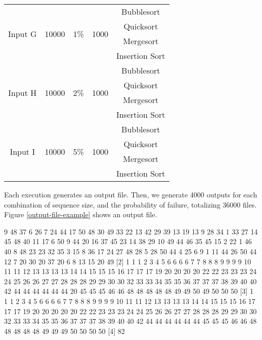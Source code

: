 \begin{table}[H]
\begin{center}
\begin{tabular}{|c|c|c|c|c|}
    \hline
    \multirow{4}{*}{Input G} & \multirow{4}{*}{10000} & \multirow{4}{*}{1\%} & \multirow{4}{*}{1000} & Bubblesort \\ 
    & & & & Quicksort \\
    & & & & Mergesort \\
    & & & & Insertion Sort \\
    \hline
    \multirow{4}{*}{Input H} & \multirow{4}{*}{10000} & \multirow{4}{*}{2\%} & \multirow{4}{*}{1000} & Bubblesort \\ 
    & & & & Quicksort \\
    & & & & Mergesort \\
    & & & & Insertion Sort \\
    \hline
    \multirow{4}{*}{Input I} & \multirow{4}{*}{10000} & \multirow{4}{*}{5\%} & \multirow{4}{*}{1000} & Bubblesort \\ 
    & & & & Quicksort \\
    & & & & Mergesort \\
    & & & & Insertion Sort \\
    \hline
    \end{tabular}
    \label{table-input-data}
    \end{center}
\end{table}

Each execution generates an output file. Then, we generate 4000 outputs for each combination of sequence size, and the probability of failure, totalizing 36000 files. Figure \ref{output-file-example} shows an output file.

\begin{verbbox}[\mbox{}]
[1]  9 48 37 6 26 7 24 44 17 50 48 30 49 33 22 13 42 29 39 13 19 13 9 28 34 1
33 27 14 45 48 40 11 17 6 50 9 44 20 16 37 45 23 14 38 29 10 49 44 46 35 45  
15 2 22 1 46 40 8 48 23 23 32 35 3 15 8 36 17 24 27 48 28 5 28 50 44 4 25 6 9
1 11 44 26 50 44 12 7 20 30 20 37 20 6 8 13 15 20 49
[2]  1 1 1 2 3 4 5 6 6 6 6 7 7 8 8 8 9 9 9 9 10 11 11 12 13 13 13 13 14 14 15 
15 15 16 17 17 17 19 20 20 20 20 22 22 23 23 23 24 24 25 26 26 27 27 28 28 28 
29 29 30 30 32 33 33 34 35 35 36 37 37 37 38 39 40 40 42 44 44 44 44 44 44 20 
45 45 45 46 46 48 48 48 48 48 49 49 50 49 50 50 50
[3]  1 1 1 2 3 4 5 6 6 6 6 7 7 8 8 8 9 9 9 9 10 11 11 12 13 13 13 13 14 14 15 
15 15 16 17 17 17 19 20 20 20 20 20 22 22 23 23 23 24 24 25 26 26 27 27 28 28 
28 29 29 30 30 32 33 33 34 35 35 36 37 37 37 38 39 40 40 42 44 44 44 44 44 44 
45 45 45 46 46 48 48 48 48 48 49 49 49 50 50 50 50
[4]  82
\end{verbbox}
    
